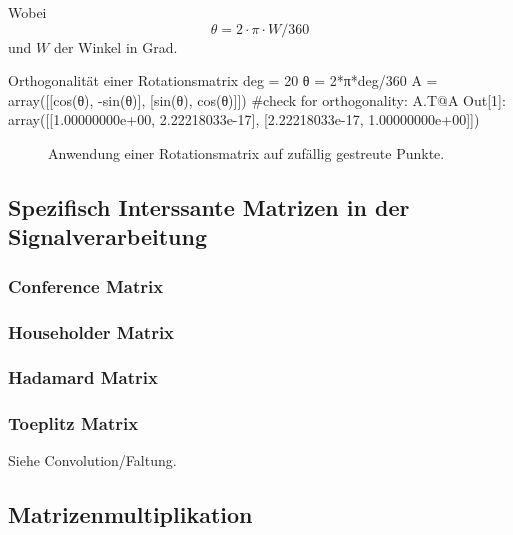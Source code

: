 Wobei $$\theta = 2\cdot \pi \cdot W / 360$$ und $W$ der Winkel in Grad.

\begin{python}{Orthogonalität einer Rotationsmatrix}
deg = 20
θ = 2*π*deg/360 
A = array([[cos(θ), -sin(θ)],
           [sin(θ), cos(θ)]])
#check for orthogonality:
A.T@A
Out[1]: array([[1.00000000e+00, 2.22218033e-17],
       [2.22218033e-17, 1.00000000e+00]])

\end{python}



\begin{figure}[H]
    \centering
    
    \caption{Anwendung einer Rotationsmatrix auf zufällig gestreute Punkte.}
    \label{fig:rotMat}
\end{figure}





\subsection{Spezifisch Interssante Matrizen in der Signalverarbeitung}

\subsubsection*{Conference Matrix}
\subsubsection*{Householder Matrix}
\subsubsection*{Hadamard Matrix}
\subsubsection*{Toeplitz Matrix}\label{subsub:toeplitz}
Siehe Convolution/Faltung.


\subsection*{Matrizenmultiplikation}

